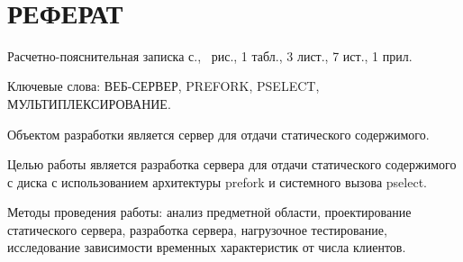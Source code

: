 

\clearpage
~\newpage

\section*{\centering РЕФЕРАТ}
\setcounter{page}{3}

Расчетно-пояснительная записка \pageref{LastPage} с., \totalfigures\ рис., 1 табл., 3 лист., 7 ист., 1 прил.

Ключевые слова: ВЕБ-СЕРВЕР, PREFORK, PSELECT, МУЛЬТИПЛЕКСИРОВАНИЕ.

Объектом разработки является сервер для отдачи статического содержимого.

Целью работы является разработка сервера для отдачи статического содержимого с диска с использованием архитектуры prefork и системного вызова pselect.

Методы проведения работы: анализ предметной области, проектирование статического сервера, разработка сервера, нагрузочное тестирование, исследование зависимости временных характеристик от числа клиентов.



